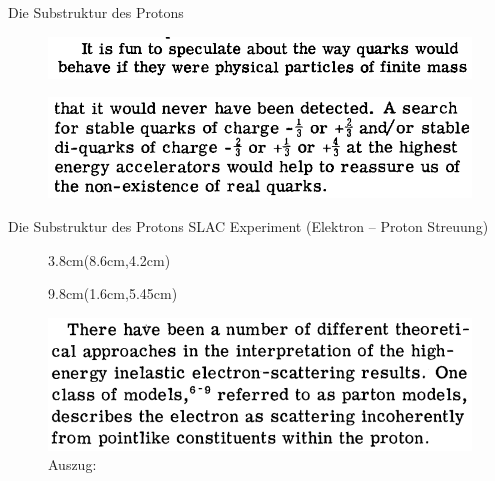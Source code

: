 \documentclass[t,9pt]{beamer}
\newcommand{\highlight}[3]{ \begin{textblock*}{#1}(#2,#3) \begin{tcolorbox} [enhanced,opacityfill=.1,colback=blue] \end{tcolorbox} \end{textblock*} } %
\begin{document}
        \begin{frame}{Die Substruktur des Protons}
                \begin{figure}
                        \centering
                        \includegraphics[width=\textwidth]{prosi_if_quarks_were_physical.png}
                        \caption{\cite{Gellmann1964}}
                \end{figure}
                \begin{figure}
                        \centering
                        \includegraphics[width=\textwidth]{prosi_non_existance_of_quarks.png}
                        \caption{\cite{Gellmann1964}}
                \end{figure}
        \end{frame}

        \begin{frame}{Die Substruktur des Protons}
                SLAC Experiment (Elektron -- Proton Streuung)
                \begin{figure}
                        \highlight{3.8cm}{8.6cm}{4.2cm}
                        \highlight{9.8cm}{1.6cm}{5.45cm}
                        \includegraphics[width=\textwidth]{prosi_bloom_et_al_obervations_could_be_parton_model.png}
                        \caption{Auszug:\cite{bloom1969}}
                \end{figure}
        \end{frame}
\end{document}
